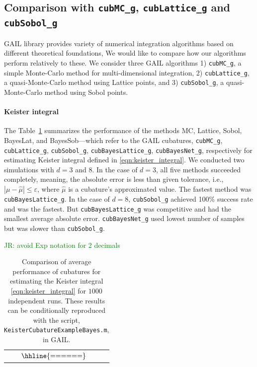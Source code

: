 \documentclass{svjour3}                     %
\newcommand{\code}[1]{\texttt{#1}}
\newcommand{\JRNote}[1]{{\textcolor{green}{JR: #1}}}
\begin{document}
{{{{{{\subsection{Comparison with \code{cubMC\_g}, \code{cubLattice\_g} and \code{cubSobol\_g}}

GAIL library provides variety of numerical integration algorithms based on different theoretical foundations, We would like to compare how our algorithms perform relatively to these. We consider three GAIL algorithms 1) \code{cubMC\_g}, a simple Monte-Carlo method for multi-dimensional integration, 2) \code{cubLattice\_g}, a quasi-Monte-Carlo method using Lattice points, and 3) \code{cubSobol\_g}, a quasi-Monte-Carlo method using Sobol points.

\paragraph{Keister integral}
The Table~\ref{tab2} summarizes the performance of the methods MC, Lattice, Sobol,
BayesLat, and BayesSob---which refer to the GAIL cubatures, \texttt{cubMC\_g},
\code{cubLattice\_g}, \code{cubSobol\_g},  \code{cubBayesLattice\_g},  \code{cubBayesNet\_g},
respectively for estimating Keister integral defined in \eqref{eqn:keister_integral}.
We conducted two simulations with $d=3$ and $8$. In the case of $d=3$, all five methods succeeded completely, meaning, the absolute error is less than given tolerance, i.e., $|\mu - \hat{\mu}| \le
\varepsilon$, where $\hat{\mu}$ is a cubature's approximated value. The
fastest method was \code{cubBayesLattice\_g}.
In the case of $d=8$,   \code{cubSobol\_g} achieved 100\% success rate
and was the fastest. But \code{cubBayesLattice\_g}  was competitive and
had the smallest average absolute error. \code{cubBayesNet\_g} used lowest number of samples but was slower than \code{cubSobol\_g}.

\JRNote{avoid Exp notation for 2 decimals}
\begin{table}[ht] %
\centering
\caption{Comparison of average performance of cubatures for estimating the Keister integral \eqref{eqn:keister_integral} for $1000$ independent runs. 
These results can be conditionally reproduced with the
script, \allowdisplaybreaks \code{KeisterCubatureExampleBayes.m}, in GAIL. 
\label{tab2}}	   
\begin{tabular}{c}
$
\arraycolsep=1.4pt\def\arraystretch{0.9}
\begin{array}{l@{\quad}r@{\quad}r@{\quad}r@{\quad}r@{\quad}r@{\quad}r}
\hhline{======}
 
\end{array}
$
\end{tabular}
\end{table}





}}}}}}
\end{document}

